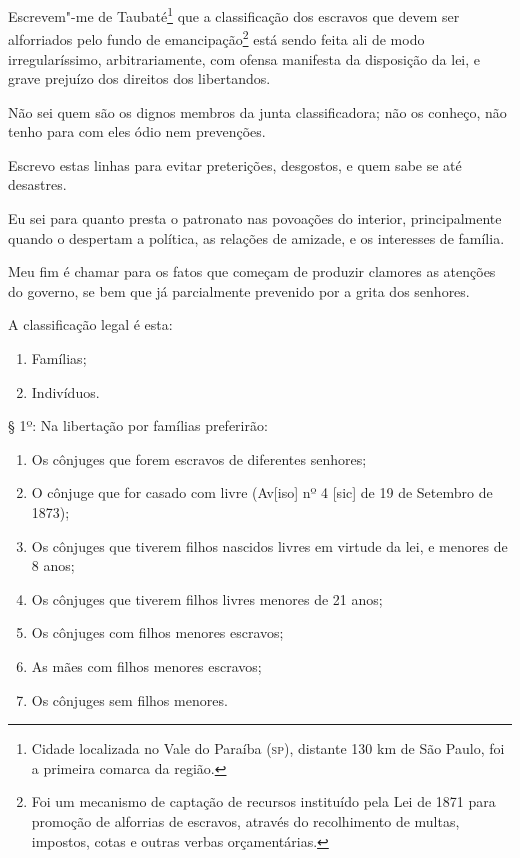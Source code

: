 Escrevem"-me de Taubaté\footnote{Cidade localizada no Vale do Paraíba
  (\textsc{sp}), distante 130 km de São Paulo, foi a primeira comarca da região.}
que a classificação dos escravos que devem ser alforriados pelo fundo de
emancipação\footnote{Foi um mecanismo de captação de recursos
  instituído pela Lei de 1871 para promoção de alforrias de escravos,
  através do recolhimento de multas, impostos, cotas e outras verbas
  orçamentárias.} está sendo feita ali de modo irregularíssimo,
arbitrariamente, com ofensa manifesta da disposição da lei, e grave
prejuízo dos direitos dos libertandos.

Não sei quem são os dignos membros da junta classificadora; não os
conheço, não tenho para com eles ódio nem prevenções.

Escrevo estas linhas para evitar preterições, desgostos, e quem sabe se
até desastres.

Eu sei para quanto presta o patronato nas povoações do interior,
principalmente quando o despertam a política, as relações de amizade, e
os interesses de família.

Meu fim é chamar para os fatos que começam de produzir clamores as
atenções do governo, se bem que já parcialmente prevenido por a grita
dos senhores.

A classificação legal é esta:

\begin{enumerate}[label={\scshape\roman*.}]
\item Famílias;

\item Indivíduos.
\end{enumerate}

§ 1º: Na libertação por famílias preferirão:
\begin{enumerate}[label={\scshape\roman*.}]
\item Os cônjuges que forem escravos de diferentes senhores;

\item O cônjuge que for casado com livre (Av{[}iso{]} nº 4 {[}sic{]} de 19
de Setembro de 1873);

\item Os cônjuges que tiverem filhos nascidos livres em virtude da lei, e
menores de 8 anos;

\item Os cônjuges que tiverem filhos livres menores de 21 anos;

\item Os cônjuges com filhos menores escravos;

\item As mães com filhos menores escravos;

\item Os cônjuges sem filhos menores.
\end{enumerate}

